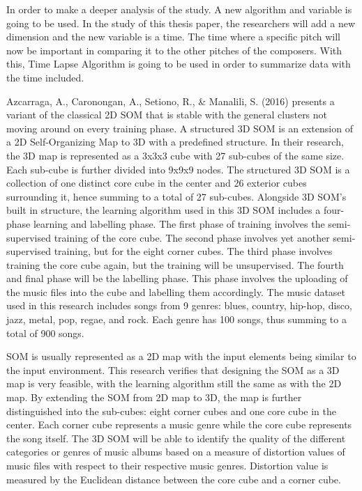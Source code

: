 	In order to make a deeper analysis of the study. A new algorithm and variable is going to be used. In the study of this thesis paper, the researchers will add a new dimension and the new variable is a time. The time where a specific pitch will now be important in comparing it to the other pitches of the composers. With this, Time Lapse Algorithm is going to be used in order to summarize data with the time included.

	Azcarraga, A., Caronongan, A., Setiono, R., \& Manalili, S. (2016) presents a variant of the classical 2D SOM that is stable with the general clusters not moving around on every training phase. A structured 3D SOM is an extension of a 2D Self-Organizing Map to 3D with a predefined structure. In their research, the 3D map is represented as a 3x3x3 cube with 27 sub-cubes of the same size. Each sub-cube is further divided into 9x9x9 nodes. The structured 3D SOM is a collection of one distinct core cube in the center and 26 exterior cubes surrounding it, hence summing to a total of 27 sub-cubes. Alongside 3D SOM’s built in structure, the learning algorithm used in this 3D SOM includes a four-phase learning and labelling phase. The first phase of training involves the semi-supervised training of the core cube. The second phase involves yet another semi-supervised training, but for the eight corner cubes. The third phase involves training the core cube again, but the training will be unsupervised. The fourth and final phase will be the labelling phase. This phase involves the uploading of the music files into the cube and labelling them accordingly. The music dataset used in this research includes songs from 9 genres: blues, country, hip-hop, disco, jazz, metal, pop, regae, and rock. Each genre has 100 songs, thus summing to a total of 900 songs.

	SOM is usually represented as a 2D map with the input elements being similar to the input environment. This research verifies that designing the SOM as a 3D map is very feasible, with the learning algorithm still the same as with the 2D map. By extending the SOM from 2D map to 3D, the map is further distinguished into the sub-cubes: eight corner cubes and one core cube in the center. Each corner cube represents a music genre while the core cube represents the song itself. The 3D SOM will be able to identify the quality of the different categories or genres of music albums based on a measure of distortion values of music files with respect to their respective music genres. Distortion value is measured by the Euclidean distance between the core cube and a corner cube.
	
